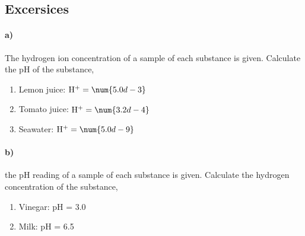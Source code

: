 \documentclass[../main.tex]{subfiles}
\begin{document}
\subsection{Excersices}

\paragraph{a)} The hydrogen ion concentration of a sample of each substance is given.
Calculate the pH of the substance,
\begin{enumerate}
    \item Lemon juice: $\mathrm{H}^+=\num{5.0d-3}$
    \item Tomato juice: $\mathrm{H}^+=\num{3.2d-4}$
    \item Seawater: $\mathrm{H}^+=\num{5.0d-9}$
\end{enumerate}

\paragraph{b)} the pH reading of a sample of each substance is given.
Calculate the hydrogen concentration of the substance,
\begin{enumerate}
    \item Vinegar: pH = \num{3.0}
    \item Milk: pH = \num{6.5}
\end{enumerate}
\end{document}

